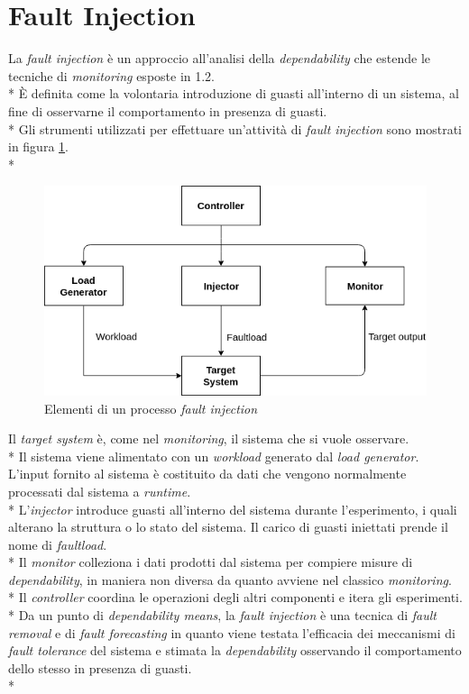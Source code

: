 \section{Fault Injection}
La \emph{fault injection} \`e un approccio all'analisi della \emph{dependability} che estende le tecniche di \emph{monitoring} esposte in 1.2.\\*
\`E definita come la volontaria introduzione di guasti all'interno di un sistema, al fine di osservarne il comportamento in presenza di guasti. \cite{faultinj1} \cite{faultinj2} \cite{faultinj3}\\*
Gli strumenti utilizzati per effettuare un'attivit\`a di \emph{fault injection} sono mostrati in figura \ref{fig:faultinj}.\\*
\begin{figure}[h]
	\centering
	\includegraphics[width=0.7\linewidth]{img/faultinj}
	\caption{Elementi di un processo \emph{fault injection}}
	\label{fig:faultinj}
\end{figure}
\FloatBarrier
Il \emph{target system} \`e, come nel \emph{monitoring}, il sistema che si vuole osservare.\\*
Il sistema viene alimentato con un \emph{workload} generato dal \emph{load generator}. L'input fornito al sistema \`e costituito da dati che vengono normalmente processati dal sistema a \emph{runtime}.\\*
L'\emph{injector} introduce guasti all'interno del sistema durante l'esperimento, i quali alterano la struttura o lo stato del sistema. Il carico di guasti iniettati prende il nome di \emph{faultload}.\\*
Il \emph{monitor} colleziona i dati prodotti dal sistema per compiere misure di \emph{dependability}, in maniera non diversa da quanto avviene nel classico \emph{monitoring}.\\*
Il \emph{controller} coordina le operazioni degli altri componenti e itera gli esperimenti.\\*
Da un punto di \emph{dependability means}, la \emph{fault injection} \`e una tecnica di \emph{fault removal} e di \emph{fault forecasting} in quanto viene testata l'efficacia dei meccanismi di \emph{fault tolerance} del sistema e stimata la \emph{dependability} osservando il comportamento dello stesso in presenza di guasti.\\*
